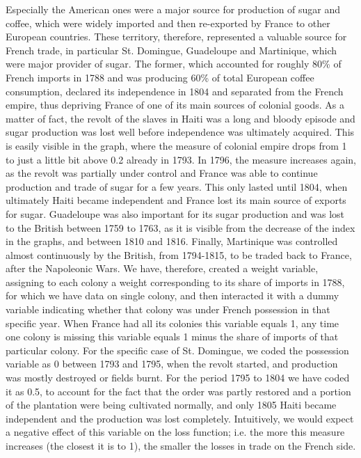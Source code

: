 \documentclass[12pt,a4paper,notitlepage,english]{article}
\begin{document}
Especially the American ones were a major source for production of sugar and coffee, which were widely imported and then re-exported by France to other European countries.
These territory, therefore, represented a valuable source for French trade, in particular St. Domingue, Guadeloupe and Martinique, which were major provider of sugar.
The former, which accounted for roughly 80\% of French imports in 1788 and was producing 60\% of total European coffee consumption, declared its independence in 1804 and separated from the French empire, thus depriving France of one of its main sources of colonial goods.
As a matter of fact, the revolt of the slaves in Haiti was a long and bloody episode and sugar production was lost well before independence was ultimately acquired.
This is easily visible in the graph, where the measure of colonial empire drops from 1 to just a little bit above 0.2 already in 1793.
In 1796, the measure increases again, as the revolt was partially under control and France was able to continue production and trade of sugar for a few years.
This only lasted until 1804, when ultimately Haiti became independent and France lost its main source of exports for sugar.
Guadeloupe was also important for its sugar production and was lost to the British between 1759 to 1763, as it is visible from the decrease of the index in the graphs, and between 1810 and 1816.
Finally, Martinique was controlled almost continuously by the British, from 1794-1815, to be traded back to France, after the Napoleonic Wars.
We have, therefore, created a weight variable, assigning to each colony a weight corresponding to its share of imports in 1788, for which we have data on single colony, and then interacted it with a dummy variable indicating whether that colony was under French possession in that specific year.
When France had all its colonies this variable equals 1, any time one colony is missing this variable equals 1 minus the share of imports of that particular colony.
For the specific case of St. Domingue, we coded the possession variable as 0 between 1793 and 1795, when the revolt started, and production was mostly destroyed or fields burnt.
For the period 1795 to 1804 we have coded it as 0.5, to account for the fact that the order was partly restored and a portion of the plantation were being cultivated normally, and only 1805 Haiti became independent and the production was lost completely.
Intuitively, we would expect a negative effect of this variable on the loss function; i.e. the more this measure increases (the closest it is to 1), the smaller the losses in trade on the French side.
\end{document}
